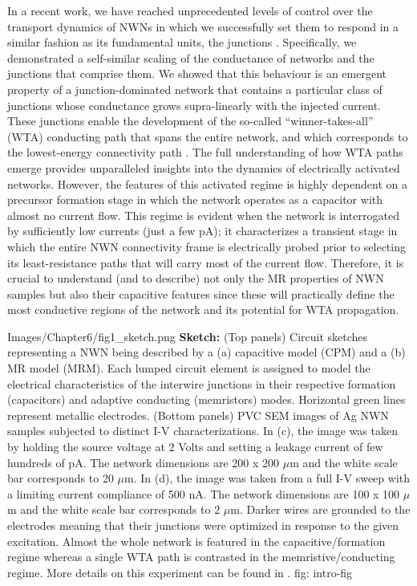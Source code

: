 In a recent work, we have reached unprecedented levels of control over the transport dynamics of NWNs in which we successfully set them to respond in a similar fashion as its fundamental units, the junctions \cite{scaling2017}. Specifically, we demonstrated a self-similar scaling of the conductance of networks and the junctions that comprise them. We showed that this behaviour is an emergent property of a junction-dominated network that contains a particular class of junctions whose conductance grows supra-linearly with the injected current. These junctions enable the development of the so-called ``winner-takes-all'' (WTA) conducting path that spans the entire network, and which corresponds to the lowest-energy connectivity path \cite{scaling2017,celano2016}. The full understanding of how WTA paths emerge provides unparalleled insights into the dynamics of electrically activated networks. However, the features of this activated regime is highly dependent on a precursor formation stage in which the network operates as a capacitor with almost no current flow. This regime is evident when the network is interrogated by sufficiently low currents (just a few pA); it characterizes a transient stage in which the entire NWN connectivity frame is electrically probed prior to selecting its least-resistance paths that will carry most of the current flow. Therefore, it is crucial to understand (and to describe) not only the MR properties of NWN samples but also their capacitive features since these will practically define the most conductive regions of the network and its potential for WTA propagation. 

{Images/Chapter6/fig1_sketch.png}
{\textbf{Sketch:}}
{(Top panels) Circuit sketches representing a NWN being described by a (a) capacitive model (CPM) and a (b) MR model (MRM). Each lumped circuit element is assigned to model the electrical characteristics of the interwire junctions in their respective formation (capacitors) and adaptive conducting (memristors) modes. Horizontal green lines represent metallic electrodes. (Bottom panels) PVC SEM images of Ag NWN samples subjected to distinct I-V characterizations. In (c), the image was taken by holding the source voltage at 2 Volts and setting a leakage current of few hundreds of pA. The network dimensions are 200 x 200 $\mu$m and the white scale bar corresponds to 20 $\mu$m. In (d), the image was taken from a full I-V sweep with a limiting current compliance of 500 nA. The network dimensions are 100 x 100 $\mu$m and the white scale bar corresponds to 2 $\mu$m. Darker wires are grounded to the electrodes meaning that their junctions were optimized in response to the given excitation. Almost the whole network is featured in the capacitive/formation regime whereas a single WTA path is contrasted in the memristive/conducting regime. More details on this experiment can be found in \cite{scaling2017}.}
{fig: intro-fig}

